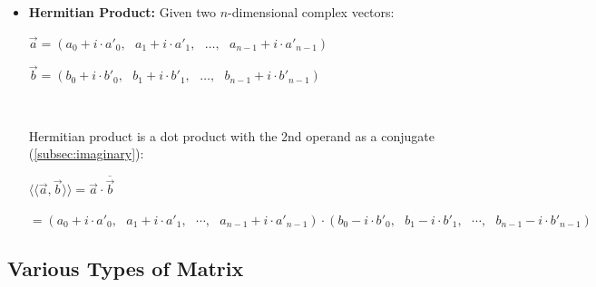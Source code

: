 \begin{tcolorbox}[title={\textbf{\tboxdef{\ref*{subsec:vector-arithmetic}} Vector Arithmetic}}]
\begin{itemize}
$ $

Hadamard product is defined as: 

$\vec{a} \odot \vec{b} = (a_0 b_0, \text{ } a_1 b_1, \text{ }\cdots, \text{ } a_{n-1} b_{n-1})$

$ $

\item \textbf{Hermitian Product:} Given two $n$-dimensional complex vectors:

$\vec{a} = (a_0 + i \cdot a'_0, \text{ } a_1+ i\cdot a'_1, \text{ }\ldots,\text{ }  a_{n-1}+ i\cdot a'_{n-1})$ 

$\vec{b} = (b_0 + i\cdot b'_0, \text{ } b_1 + i\cdot b'_1, \text{ }\ldots, \text{ } b_{n-1} + i\cdot b'_{n-1})$

$ $

Hermitian product is a dot product with the 2nd operand as a conjugate (\autoref{subsec:imaginary}): 

$\langle\langle \vec{a}, \vec{b} \rangle\rangle =  \vec{a} \cdot \overline{\vec{b}} $

$ = (a_0 + i \cdot a'_0, \text{ } a_1+ i\cdot a'_1, \text{ }\cdots,\text{ } a_{n-1}+ i\cdot a'_{n-1})  \cdot (b_0 - i\cdot b'_0, \text{ } b_1 - i\cdot b'_1, \text{ }\cdots, \text{ } b_{n-1} - i\cdot b'_{n-1})$




\end{itemize}
\end{tcolorbox}




\subsection{Various Types of Matrix}
\label{subsec:vandermonde}


